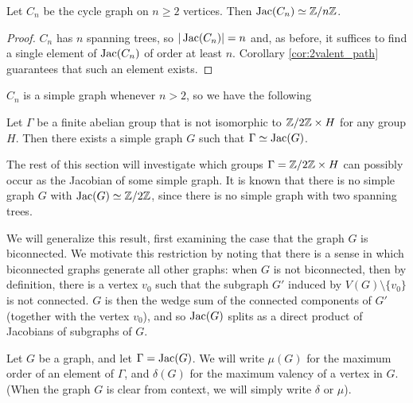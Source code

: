 \documentclass{amsart}
\begin{document}
\begin{cor}
  \label{prop:cycle_cyclic}
  Let $C_n$ be the cycle graph on $n \ge 2$ vertices. Then $\operatorname{Jac}(C_n) \simeq
  \mathbb{Z}/n\mathbb{Z}$.
\end{cor}
\begin{proof}
$C_n$ has $n$ spanning trees, so $|\operatorname{Jac}(C_n)|=n$ and, as before, it
suffices to find a single element of $\operatorname{Jac}(C_n)$ of order at least
$n$. Corollary \ref{cor:2valent_path} guarantees that such an element
exists.
\end{proof}

$C_n$ is a simple graph whenever $n > 2$, so we have the following

\begin{cor}
  Let $\Gamma$ be a finite abelian group that is not isomorphic to
  $\mathbb{Z}/2\mathbb{Z} \times H$ for any group $H$. Then there exists a simple
  graph $G$ such that $\Gamma \simeq \operatorname{Jac}(G)$.
\end{cor}

The rest of this section will investigate which groups $\Gamma =
\mathbb{Z}/2\mathbb{Z} \times H$ can possibly occur as the Jacobian of some simple
graph. It is known that there is no simple graph $G$ with $\operatorname{Jac}(G)
\simeq \mathbb{Z}/2\mathbb{Z}$, since there is no simple graph with two spanning
trees. 

We will generalize this result, first examining the case that the
graph $G$ is biconnected. We motivate this restriction by noting that
there is a sense in which biconnected graphs generate all other
graphs: when $G$ is not biconnected, then by definition, there is a
vertex $v_0$ such that the subgraph $G'$ induced by $V(G) \setminus
\{v_0\}$ is not connected. $G$ is then the wedge sum of the connected
components of $G'$ (together with the vertex $v_0$), and so $\operatorname{Jac}(G)$
splits as a direct product of Jacobians of subgraphs of $G$.

\begin{defn}
  Let $G$ be a graph, and let $\Gamma = \operatorname{Jac}(G)$. We will write $\mu(G)$
  for the maximum order of an element of $\Gamma$, and $\delta(G)$ for
  the maximum valency of a vertex in $G$. (When the graph $G$ is clear
  from context, we will simply write $\delta$ or $\mu$). 
\end{defn}
\end{document}
